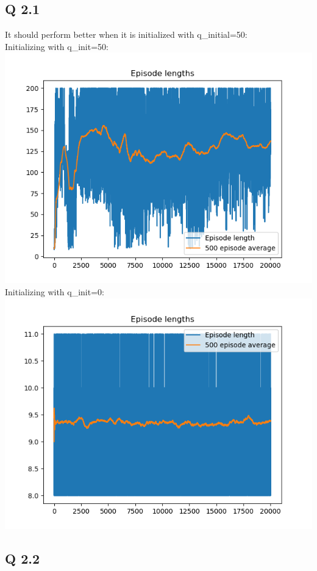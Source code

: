 \documentclass{article}
\begin{document}
\subsection{Q 2.1}
It should perform better when it is initialized with q\_initial=50:\\
Initializing with q\_init=50:
\includegraphics[scale=0.45]{50inittrainingiters.png}\\
Initializing with q\_init=0:
\includegraphics[scale=0.45]{0inittrainingiters.png}

\subsection{Q 2.2}
\end{document}
